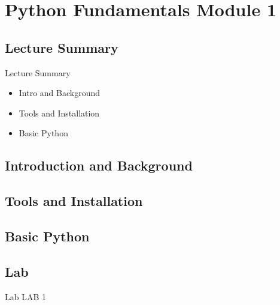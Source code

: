 \section{Python Fundamentals Module 1}

\subsection{Lecture Summary}
\begin{Slide}{Lecture Summary}
  \begin{itemize}
  \item Intro and Background
  \item Tools and Installation
  \item Basic Python
  \end{itemize}
\end{Slide}

\subsection{Introduction and Background}


\subsection{Tools and Installation}


\subsection{Basic Python}


\subsection{Lab}
\begin{Slide}{Lab}
  LAB 1
\end{Slide}
